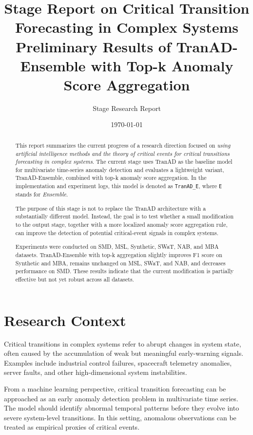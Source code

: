 \documentclass[a4paper,11pt]{article}
\title{\textbf{Stage Report on Critical Transition Forecasting in Complex Systems}\\
\large Preliminary Results of TranAD-Ensemble with Top-k Anomaly Score Aggregation}
\author{Stage Research Report}
\date{\today}
\begin{document}
\maketitle

\begin{abstract}
This report summarizes the current progress of a research direction focused on
\textit{using artificial intelligence methods and the theory of critical events for critical transitions forecasting in complex systems}. The current stage uses TranAD as the baseline model for multivariate time-series anomaly detection and evaluates a lightweight variant, TranAD-Ensemble, combined with top-k anomaly score aggregation. In the implementation and experiment logs, this model is denoted as \texttt{TranAD\_E}, where \texttt{E} stands for \textit{Ensemble}.

The purpose of this stage is not to replace the TranAD architecture with a substantially different model. Instead, the goal is to test whether a small modification to the output stage, together with a more localized anomaly score aggregation rule, can improve the detection of potential critical-event signals in complex systems.

Experiments were conducted on SMD, MSL, Synthetic, SWaT, NAB, and MBA datasets. TranAD-Ensemble with top-k aggregation slightly improves F1 score on Synthetic and MBA, remains unchanged on MSL, SWaT, and NAB, and decreases performance on SMD. These results indicate that the current modification is partially effective but not yet robust across all datasets.
\end{abstract}

\section{Research Context}

Critical transitions in complex systems refer to abrupt changes in system state, often caused by the accumulation of weak but meaningful early-warning signals. Examples include industrial control failures, spacecraft telemetry anomalies, server faults, and other high-dimensional system instabilities.

From a machine learning perspective, critical transition forecasting can be approached as an early anomaly detection problem in multivariate time series. The model should identify abnormal temporal patterns before they evolve into severe system-level transitions. In this setting, anomalous observations can be treated as empirical proxies of critical events.
\end{document}
